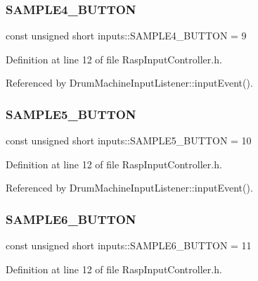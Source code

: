 \subsubsection{\texorpdfstring{S\+A\+M\+P\+L\+E4\+\_\+\+B\+U\+T\+T\+ON}{SAMPLE4\_BUTTON}}
{\footnotesize\ttfamily const unsigned short inputs\+::\+S\+A\+M\+P\+L\+E4\+\_\+\+B\+U\+T\+T\+ON = 9}



Definition at line 12 of file Rasp\+Input\+Controller.\+h.



Referenced by Drum\+Machine\+Input\+Listener\+::input\+Event().

\mbox{\label{namespaceinputs_ad22ade847b4a38fd418dccda07814551}} 
\subsubsection{\texorpdfstring{S\+A\+M\+P\+L\+E5\+\_\+\+B\+U\+T\+T\+ON}{SAMPLE5\_BUTTON}}
{\footnotesize\ttfamily const unsigned short inputs\+::\+S\+A\+M\+P\+L\+E5\+\_\+\+B\+U\+T\+T\+ON = 10}



Definition at line 12 of file Rasp\+Input\+Controller.\+h.



Referenced by Drum\+Machine\+Input\+Listener\+::input\+Event().

\mbox{\label{namespaceinputs_a88edcfa8b89df1abcca33bcec05974c4}} 
\subsubsection{\texorpdfstring{S\+A\+M\+P\+L\+E6\+\_\+\+B\+U\+T\+T\+ON}{SAMPLE6\_BUTTON}}
{\footnotesize\ttfamily const unsigned short inputs\+::\+S\+A\+M\+P\+L\+E6\+\_\+\+B\+U\+T\+T\+ON = 11}



Definition at line 12 of file Rasp\+Input\+Controller.\+h.



